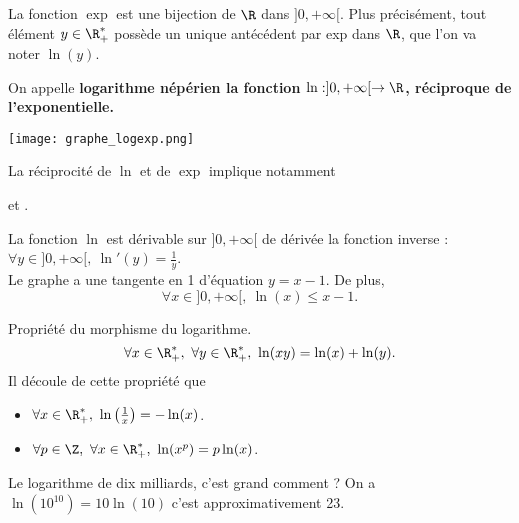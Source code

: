 \documentclass[11pt]{article}
\begin{document}
La fonction $\exp$ est une bijection de $\R$ dans $]0,+\infty[$. Plus précisément, tout élément $y\in\R_+^*$ possède un unique antécédent par exp dans $\R$, que l'on va noter $\ln(y)$.

\begin{defi}{}{}
    On appelle \bf{logarithme népérien} la fonction $\ln:]0,+\infty[\to\R$, réciproque de l'exponentielle.
\end{defi}

\begin{center}
    \texttt{[image: graphe\_logexp.png]}
\end{center}

La réciprocité de $\ln$ et de $\exp$ implique notamment
\begin{center}
     \quad et \quad \boxed{\forall y \in ]0,+\infty[, ~ \exp(\ln(y))=y}.
\end{center}

\begin{prop}{}{}
    La fonction $\ln$ est dérivable sur $]0,+\infty[$ de dérivée la fonction inverse : $\forall y \in ]0,+\infty[,~\ln'(y)=\frac{1}{y}$.\\
    Le graphe a une tangente en 1 d'équation $y=x-1$. De plus,
    \begin{equation*}
        \forall x \in ]0,+\infty[,~\ln(x)\leq x-1.
    \end{equation*}
\end{prop}

\begin{prop}{Propriété du morphisme du logarithme.}{}
    \begin{equation*}
        \forall x \in \R^*_+,~\forall y \in \R^*_+,~\ln(xy)=\ln(x)+\ln(y).
    \end{equation*}
    Il découle de cette propriété que
    \begin{itemize}
        \item $\forall x \in \R^*_+,~\ln\left( \frac{1}{x} \right)=-\ln(x)$.
        \item $\forall p \in \Z,~\forall x \in \R_+^*,~\ln(x^p)=p\ln(x)$.
    \end{itemize}
\end{prop}

\begin{ex}{}{}
    Le logarithme de dix milliards, c'est grand comment ?
    \tcblower
    On a $\ln(10^10)=10\ln(10)$ c'est approximativement 23.
\end{ex}
\end{document}
